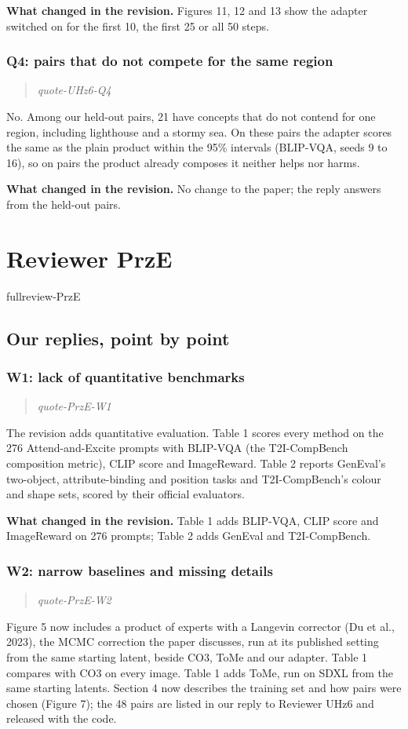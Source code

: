 \documentclass[11pt]{article}
\def\showfullreviews{}   %
\def\showquotes{}        %
\newcommand{\fullreview}[1]{\ifdefined\showfullreviews\csname fullreview-#1\endcsname\fi}
\newcommand{\reviewquote}[2]{\ifdefined\showquotes\begin{quote}\color{rev}\itshape\csname quote-#1-#2\endcsname\end{quote}\fi}
\newcommand{\changed}[1]{\par{\color{chg}\textbf{What changed in the revision.}} #1\par}
\begin{document}
\changed{Figures 11, 12 and 13 show the adapter switched on for the first 10, the first 25 or all 50 steps.}

\subsubsection*{Q4: pairs that do not compete for the same region}
\reviewquote{UHz6}{Q4}

No. Among our held-out pairs, 21 have concepts that do not contend for one region, including lighthouse and a stormy sea. On these pairs the adapter scores the same as the plain product within the 95\% intervals (BLIP-VQA, seeds 9 to 16), so on pairs the product already composes it neither helps nor harms.

\changed{No change to the paper; the reply answers from the held-out pairs.}

\section*{Reviewer PrzE}
\fullreview{PrzE}

\subsection*{Our replies, point by point}

\subsubsection*{W1: lack of quantitative benchmarks}
\reviewquote{PrzE}{W1}

The revision adds quantitative evaluation. Table 1 scores every method on the 276 Attend-and-Excite prompts with BLIP-VQA (the T2I-CompBench composition metric), CLIP score and ImageReward. Table 2 reports GenEval's two-object, attribute-binding and position tasks and T2I-CompBench's colour and shape sets, scored by their official evaluators.

\changed{Table 1 adds BLIP-VQA, CLIP score and ImageReward on 276 prompts; Table 2 adds GenEval and T2I-CompBench.}

\subsubsection*{W2: narrow baselines and missing details}
\reviewquote{PrzE}{W2}

Figure 5 now includes a product of experts with a Langevin corrector (Du et al., 2023), the MCMC correction the paper discusses, run at its published setting from the same starting latent, beside CO3, ToMe and our adapter. Table 1 compares with CO3 on every image. Table 1 adds ToMe, run on SDXL from the same starting latents. Section 4 now describes the training set and how pairs were chosen (Figure 7); the 48 pairs are listed in our reply to Reviewer UHz6 and released with the code.
\end{document}
